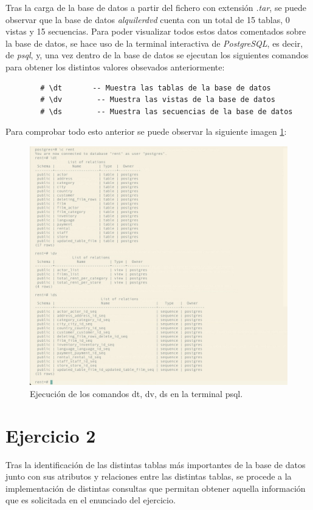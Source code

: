 \documentclass{report}
\begin{document}
	Tras la carga de la base de datos a partir del fichero con extensión \emph{.tar}, se puede observar que la base de datos \emph{alquilerdvd} cuenta con un total de 15 tablas, 0 vistas y 15 secuencias. Para poder visualizar todos estos datos comentados sobre la base de datos, se hace uso de la terminal interactiva de \emph{PostgreSQL}, es decir, de \emph{psql}, y, una vez dentro de la base de datos se ejecutan los siguientes comandos para obtener los distintos valores obsevados anteriormente:

	\begin{verbatim}
		# \dt 		-- Muestra las tablas de la base de datos 
		# \dv		 -- Muestra las vistas de la base de datos
		# \ds		 -- Muestra las secuencias de la base de datos
	\end{verbatim}

	Para comprobar todo esto anterior se puede observar la siguiente imagen \ref{fig:Exercice-1}:

	\begin{figure}[H]
    \centering
    \includegraphics[scale=0.4]{img/Exercice-1-Comprobation.jpeg}
    \caption{Ejecución de los comandos dt, dv, ds en la terminal psql.}
    \label{fig:Exercice-1}
  \end{figure}

	\section{Ejercicio 2}
	Tras la identificación de las distintas tablas más importantes de la base de datos junto con sus atributos  y relaciones entre las distintas tablas, se procede a la implementación de distintas consultas que permitan obtener aquella información que es solicitada en el enunciado del ejercicio.\\
\end{document}
